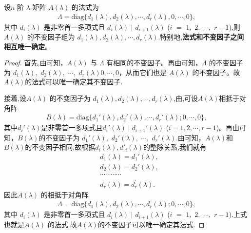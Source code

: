 \documentclass[../../main.tex]{subfiles}%
\begin{document}
\begin{corollary}\label{corollary:不变因子和法式相互唯一确定}
设$n$ 阶 $\lambda$-矩阵 $A(\lambda)$ 的法式为
\begin{align*}
\varLambda=\mathrm{diag}\{d_1(\lambda),d_2(\lambda),\cdots,d_r(\lambda),0,\cdots,0\},
\end{align*}
其中 $d_i(\lambda)$ 是非零首一多项式且 $d_i(\lambda)$ $\mid$ $ d_{i + 1}(\lambda)$ ($i$ $=$ $1,$ $2,$ $\cdots,$ $r - 1$),则 $A(\lambda)$ 的不变因子组为 $d_1(\lambda),d_2(\lambda),\cdots,d_r(\lambda)$.特别地,\textbf{法式和不变因子之间相互唯一确定}。
\end{corollary}
\begin{proof}
首先,由可知，$A(\lambda)$ 与 $\varLambda$ 有相同的不变因子。再由可知，$\varLambda$ 的不变因子为 $d_1(\lambda),$ $d_2(\lambda),$ $\cdots,$ $d_r(\lambda)0,\cdots,0$，从而它们也是 $A(\lambda)$ 的不变因子。故$A(\lambda)$的法式可以唯一确定其不变因子.

接着,设$A(\lambda)$ 的不变因子为 $d_1(\lambda),d_2(\lambda),\cdots,d_r(\lambda)$,由,可设$A(\lambda)$相抵于对角阵
\begin{align}
B(\lambda)=\mathrm{diag}\{d_1'(\lambda),d_2'(\lambda),\cdots,d_r'(\lambda);0,\cdots,0\},
\end{align}
其中$d_i'(\lambda)$是非零首一多项式且$d_i'(\lambda)\mid d_{i + 1}'(\lambda)$ ($i = 1,2,\cdots,r - 1$)。再由可知，$B(\lambda)$的不变因子为 $d_1'(\lambda),$ $d_2'(\lambda),$ $\cdots,$ $d_r'(\lambda)$.由可知，$A(\lambda)$和$B(\lambda)$的不变因子相同,故根据$d_i(\lambda),d'_i(\lambda)$的整除关系,我们就有
\begin{align*}
&d_1\left( \lambda \right) =d_1'(\lambda ),
\\
&d_2\left( \lambda \right) =d_2' (\lambda ),
\\
&\cdots \cdots \cdots \cdots 
\\
&d_r\left( \lambda \right) =d_{r}^{\prime}\left( \lambda \right) .
\end{align*}
因此$A(\lambda)$ 的相抵于对角阵
\begin{align*}
\varLambda=\mathrm{diag}\{d_1(\lambda),d_2(\lambda),\cdots,d_r(\lambda);0,\cdots,0\},
\end{align*}
其中 $d_i(\lambda)$ 是非零首一多项式且 $d_i(\lambda)$ $\mid$ $ d_{i + 1}(\lambda)$ ($i$ $=$ $1,$ $2,$ $\cdots,$ $r - 1$).上式也就是$A(\lambda)$ 的法式.故$A(\lambda)$的不变因子可以唯一确定其法式.
\end{proof}
\end{document}
